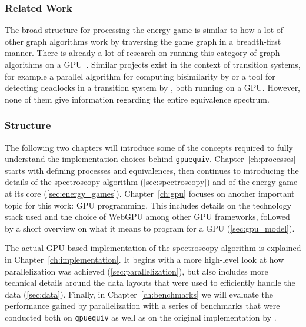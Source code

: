 \subsubsection{Related Work}

The broad structure for processing the energy game
is similar to how a lot of other graph algorithms work
by traversing the game graph in a breadth-first manner.
There is already a lot of research on running this category of graph
algorithms on a GPU~\cite{Merrill2015,Busato2018,Hijma2023}.
Similar projects exist in the context of transition systems,
for example a parallel algorithm for computing bisimilarity
by \textcite{Martens2023}
or a tool for detecting deadlocks in a transition system
by \textcite{Wijs2023},
both running on a GPU\@.
However, none of them give information
regarding the entire equivalence spectrum.

\subsubsection{Structure}

The following two chapters will introduce some of the concepts required to
fully understand the implementation choices behind \texttt{gpuequiv}.
Chapter~\ref{ch:processes} starts with defining processes and equivalences,
then continues to introducing the details of
the spectroscopy algorithm (\ref{sec:spectroscopy})
and of the energy game at its core (\ref{sec:energy_games}).
Chapter~\ref{ch:gpu} focuses on another important topic for this work:
GPU programming.
This includes details on the technology stack used
and the choice of WebGPU among other GPU frameworks,
followed by a short overview on what it means
to program for a GPU (\ref{sec:gpu_model}).

The actual GPU-based implementation of the spectroscopy algorithm is explained
in Chapter~\ref{ch:implementation}.
It begins with a more high-level look at how parallelization was achieved
(\ref{sec:parallelization}),
but also includes more technical details around the data layouts
that were used to efficiently handle the data (\ref{sec:data}).
Finally, in Chapter~\ref{ch:benchmarks} we will evaluate the performance
gained by parallelization with a series of benchmarks that were
conducted both on \texttt{gpuequiv} as well as on the original implementation
by \textcite{bisping2023process}.
